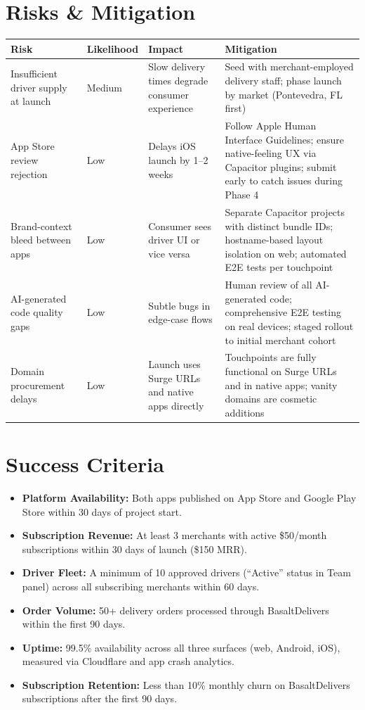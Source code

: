 \documentclass[11pt, letterpaper]{article}
\begin{document}
\section{Risks \& Mitigation}

\begin{center}
\begin{tabularx}{\textwidth}{@{}l l X X@{}}
\toprule
\textbf{Risk} & \textbf{Likelihood} & \textbf{Impact} & \textbf{Mitigation} \\
\midrule
Insufficient driver supply at launch & Medium & Slow delivery times degrade consumer experience & Seed with merchant-employed delivery staff; phase launch by market (Pontevedra, FL first) \\
App Store review rejection & Low & Delays iOS launch by 1--2 weeks & Follow Apple Human Interface Guidelines; ensure native-feeling UX via Capacitor plugins; submit early to catch issues during Phase 4 \\
Brand-context bleed between apps & Low & Consumer sees driver UI or vice versa & Separate Capacitor projects with distinct bundle IDs; hostname-based layout isolation on web; automated E2E tests per touchpoint \\
AI-generated code quality gaps & Low & Subtle bugs in edge-case flows & Human review of all AI-generated code; comprehensive E2E testing on real devices; staged rollout to initial merchant cohort \\
Domain procurement delays & Low & Launch uses Surge URLs and native apps directly & Touchpoints are fully functional on Surge URLs and in native apps; vanity domains are cosmetic additions \\
\bottomrule
\end{tabularx}
\end{center}

\section{Success Criteria}

\begin{itemize}
    \item \textbf{Platform Availability:} Both apps published on App Store and Google Play Store within 30 days of project start.
    \item \textbf{Subscription Revenue:} At least 3 merchants with active \$50/month subscriptions within 30 days of launch (\$150 MRR).
    \item \textbf{Driver Fleet:} A minimum of 10 approved drivers (``Active'' status in Team panel) across all subscribing merchants within 60 days.
    \item \textbf{Order Volume:} 50+ delivery orders processed through BasaltDelivers within the first 90 days.
    \item \textbf{Uptime:} 99.5\% availability across all three surfaces (web, Android, iOS), measured via Cloudflare and app crash analytics.
    \item \textbf{Subscription Retention:} Less than 10\% monthly churn on BasaltDelivers subscriptions after the first 90 days.
\end{itemize}
\end{document}
